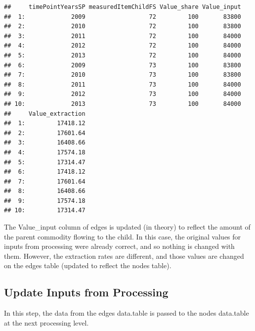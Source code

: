 \documentclass[nojss]{jss}
\begin{document}
\begin{knitrout}
\begin{kframe}
\begin{alltt}
\hlstd{(}     
\hlstd{edges[,} \hlstd{(}\hlstd{,} \hlstd{,} \hlstd{,}
          \hlstd{,} \hlstd{),}  \hlstd{=} \hlstd{]}
\end{alltt}
\begin{verbatim}
##     timePointYearsSP measuredItemChildFS Value_share Value_input
##  1:             2009                  72         100       83800
##  2:             2010                  72         100       83800
##  3:             2011                  72         100       84000
##  4:             2012                  72         100       84000
##  5:             2013                  72         100       84000
##  6:             2009                  73         100       83800
##  7:             2010                  73         100       83800
##  8:             2011                  73         100       84000
##  9:             2012                  73         100       84000
## 10:             2013                  73         100       84000
##     Value_extraction
##  1:         17418.12
##  2:         17601.64
##  3:         16408.66
##  4:         17574.18
##  5:         17314.47
##  6:         17418.12
##  7:         17601.64
##  8:         16408.66
##  9:         17574.18
## 10:         17314.47
\end{verbatim}
\end{kframe}
\end{knitrout}

The Value\_input column of edges is updated (in theory) to reflect the amount
of the parent commodity flowing to the child.  In this case, the original
values for inputs from processing were already correct, and so nothing is
changed with them.  However, the extraction rates are different, and those
values are changed on the edges table (updated to reflect the nodes table).

\subsection{Update Inputs from Processing}

In this step, the data from the edges data.table is passed to the nodes
data.table at the next processing level.
\end{document}
